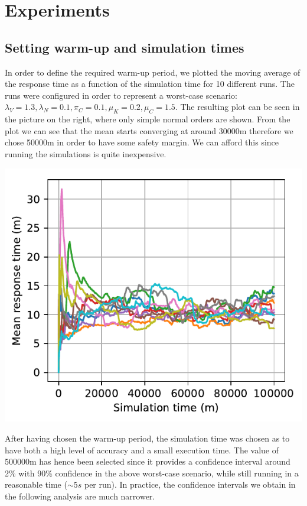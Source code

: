 \section{Experiments}

\subsection{Setting warm-up and simulation times}

\begin{minipage}{.6\textwidth}
  In order to define the required warm-up period, we plotted the moving average of the response time as a function of the simulation time for 10 different runs. The runs were configured in order to represent a worst-case scenario: $\lambda_V=1.3, \lambda_N=0.1,\pi_C=0.1,\mu_K=0.2,\mu_C=1.5$. The resulting plot can be seen in the picture on the right, where only simple normal orders are shown. From the plot we can see that the mean starts converging at around 30000m therefore we chose 50000m in order to have some safety margin. We can afford this since running the simulations is quite inexpensive.
\end{minipage}
\begin{minipage}{.4\textwidth}
  \centering
  \includegraphics[width=\textwidth]{figs/warmup_definition.pdf}
  \label{fig:warmup}
\end{minipage}

After having chosen the warm-up period, the simulation time was chosen as to have both a high level of accuracy and a small execution time. The value of 500000m has hence been selected since it provides a confidence interval around 2\% with 90\% confidence in the above worst-case scenario, while still running in a reasonable time ($\sim 5s$ per run). In practice, the confidence intervals we obtain in the following analysis are much narrower.

